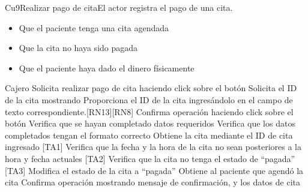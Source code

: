 \begin{UseCase}{Cu9}{Realizar pago de cita}{El actor registra el pago de una cita.}
{\begin{itemize}
            \item Que el paciente tenga una cita agendada
            \item Que la cita no haya sido pagada
            \item Que el paciente haya dado el dinero físicamente
        \end{itemize}
   	}
	
\end{UseCase} 

\begin{UCtrayectoria}{Cajero}
		\UCpaso[\UCactor] Solicita realizar pago de cita haciendo click sobre el botón 
		\UCpaso Solicita el ID de la cita mostrando 
		\UCpaso[\UCactor] Proporciona el ID de la cita ingresándolo en el campo de texto correspondiente.[RN13][RN8]
		\UCpaso[\UCactor] Confirma operación haciendo click sobre el botón 
		\UCpaso Verifica que se hayan completado datos requeridos
		\UCpaso Verifica que los datos completados tengan el formato correcto
		\UCpaso Obtiene la cita mediante el ID de cita ingresado [TA1]
		\UCpaso Verifica que la fecha y la hora de la cita no sean posteriores a la hora y fecha actuales [TA2]
		\UCpaso Verifica que la cita no tenga el estado de ``pagada'' [TA3]
		\UCpaso Modifica el estado de la cita a ``pagada''
		\UCpaso Obtiene al paciente que agendó la cita 
		\UCpaso Confirma operación mostrando mensaje de confirmación, y los datos de cita
\end{UCtrayectoria}

